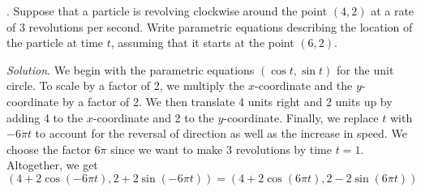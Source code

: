 \documentclass[11pt]{article}
\theoremstyle{definition}
\newcounter{prob}
\newcommand\itm{\theprob.  \stepcounter{prob}}
\newcommand\sol[2]{\textit{Solution}. #1}
\newcommand\sol[2]{#2}
\begin{document}
\itm Suppose that a particle is revolving clockwise around the point $(4,2)$ at a rate of 3 revolutions per second. Write parametric equations describing the location of the particle at time $t$, assuming that it starts at the point $(6,2)$. 

\sol{We begin with the parametric equations $(\cos t,\sin t)$ for the unit circle. To scale by a factor of 2, we multiply the $x$-coordinate and the $y$-coordinate by a factor of 2. We then translate 4 units right and 2 units up by adding 4 to the $x$-coordinate and 2 to the $y$-coordinate. Finally, we replace $t$ with $-6\pi t$ to account for the reversal of direction as well as the increase in speed. We choose the factor $6\pi$ since we want to make 3 revolutions by time $t=1$. Altogether, we get $(4+2\cos(-6\pi t),2+2\sin(-6\pi t)) = \boxed{(4+2\cos(6\pi t),2-2\sin(6\pi t))}$}{}
\end{document}
